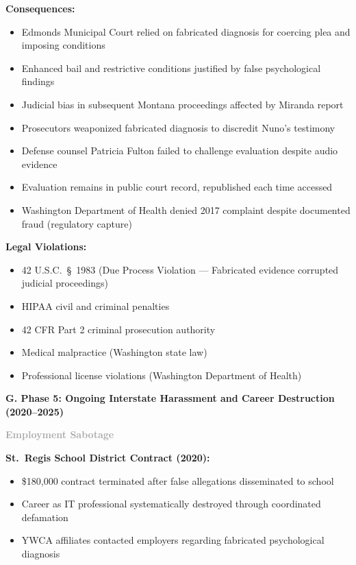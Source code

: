 \documentclass[11pt, letterpaper]{article}
\newcommand{\subsectiontitle}[1]{\vspace{0.15in}\noindent\textcolor{NavyBlue}{\textbf{#1}}\vspace{0.05in}}
\newcommand{\subsubsectiontitle}[1]{\vspace{0.1in}\noindent\textcolor{DarkGray}{\textbf{#1}}\vspace{0.05in}}
\begin{document}
\textbf{Consequences:}
\begin{itemize}[leftmargin=*,itemsep=2pt]
    \item Edmonds Municipal Court relied on fabricated diagnosis for coercing plea and imposing conditions
    \item Enhanced bail and restrictive conditions justified by false psychological findings
    \item Judicial bias in subsequent Montana proceedings affected by Miranda report
    \item Prosecutors weaponized fabricated diagnosis to discredit Nuno's testimony
    \item Defense counsel Patricia Fulton failed to challenge evaluation despite audio evidence
    \item Evaluation remains in public court record, republished each time accessed
    \item Washington Department of Health denied 2017 complaint despite documented fraud (regulatory capture)
\end{itemize}

\textbf{Legal Violations:}
\begin{itemize}[leftmargin=*,itemsep=2pt]
    \item 42 U.S.C.\ \S\ 1983 (Due Process Violation --- Fabricated evidence corrupted judicial proceedings)
    \item HIPAA civil and criminal penalties
    \item 42 CFR Part 2 criminal prosecution authority
    \item Medical malpractice (Washington state law)
    \item Professional license violations (Washington Department of Health)
\end{itemize}

\subsectiontitle{G. Phase 5: Ongoing Interstate Harassment and Career Destruction (2020--2025)}

\subsubsectiontitle{Employment Sabotage}

\textbf{St.\ Regis School District Contract (2020):}
\begin{itemize}[leftmargin=*,itemsep=2pt]
    \item \$180,000 contract terminated after false allegations disseminated to school
    \item Career as IT professional systematically destroyed through coordinated defamation
    \item YWCA affiliates contacted employers regarding fabricated psychological diagnosis
\end{itemize}
\end{document}
